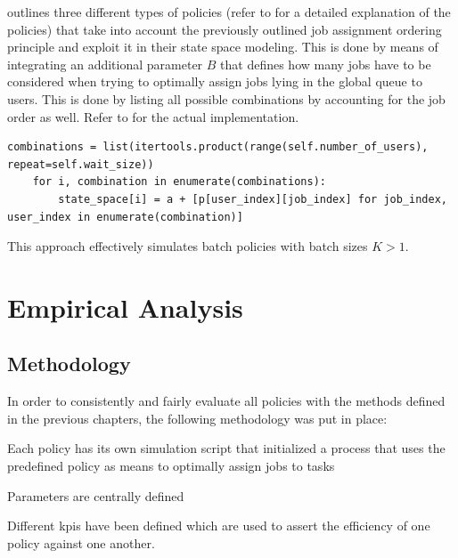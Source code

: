 \documentclass[draft=false]{seal_thesis}
\begin{document}
 outlines three different types of policies (refer to  for a detailed explanation of the policies) that take into account the previously outlined job assignment ordering principle and exploit it in their state space modeling. This is done by means of integrating an additional parameter $B$ that defines how many jobs have to be considered when trying to optimally assign jobs lying in the global queue to users. This is done by listing all possible combinations by accounting for the job order as well. Refer to  for the actual implementation.

\begin{lstlisting}[caption=State space modeling by considering $B$ jobs from the global queue and integrating all possible combinations,label=lst:wz_combinations,style=CustomPython]
	combinations = list(itertools.product(range(self.number_of_users), repeat=self.wait_size))
    for i, combination in enumerate(combinations):
        state_space[i] = a + [p[user_index][job_index] for job_index, user_index in enumerate(combination)]
\end{lstlisting}

This approach effectively simulates batch policies with batch sizes $K>1$.

\glsresetall

\chapter{Empirical Analysis}
\label{ch:empirical_analysis}

\section{Methodology}

In order to consistently and fairly evaluate all policies with the methods defined in the previous chapters, the following methodology was put in place:
\begin{enumerate*}
	\item Each policy has its own simulation script that initialized a process that uses the predefined policy as means to optimally assign jobs to tasks
	\item Parameters are centrally defined
	\item Different \glspl{kpi} have been defined which are used to assert the efficiency of one policy against one another.
\end{enumerate*}
\end{document}
